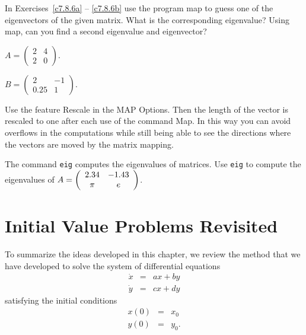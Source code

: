 \noindent In Exercises~\ref{c7.8.6a} -- \ref{c7.8.6b} use the program
{\sf map} to guess one of the eigenvectors of the given matrix.  What is
the corresponding eigenvalue?  Using {\sf map}, can you find a second
eigenvalue and eigenvector?
\begin{exercise} \label{c7.8.6a}
$A=\left(\begin{array}{rr} 2 & 4\\ 2 & 0
\end{array}\right)$.
\end{exercise}
\begin{exercise} \label{c7.8.6b}
$B=\left(\begin{array}{rr} 2 & -1\\ 0.25 & 1
\end{array}\right)$.

 Use the feature {\sf Rescale} in the
{\sf MAP Options}.  Then the length of the vector is rescaled to one
after each use of the command {\sf Map}. In this way you can avoid
overflows in the computations while still being able to see the
directions where the vectors are moved by the matrix mapping.
\end{exercise}

\begin{exercise} \label{c7.8.7}
The \Matlab command {\tt eig} computes the eigenvalues
of matrices.  Use {\tt eig} to compute the eigenvalues of 
$A = \left(\begin{array}{cc} 2.34 & -1.43\\ \pi &e\end{array}\right)$.
\end{exercise}



\section{Initial Value Problems Revisited}
\label{S:IVPR}

To summarize the ideas developed in this chapter, we review the method
that we have developed to solve the system of differential equations
\begin{equation} \label{E:2dode}
\begin{array}{rcl}
\dot{x} & = & ax+by \\
\dot{y} & = & cx+dy
\end{array}
\end{equation}
satisfying the initial conditions
\begin{equation} \label{E:2dic}
\begin{array}{rcl}
   x(0) & = & x_0 \\
   y(0) & = & y_0.
\end{array}
\end{equation}

